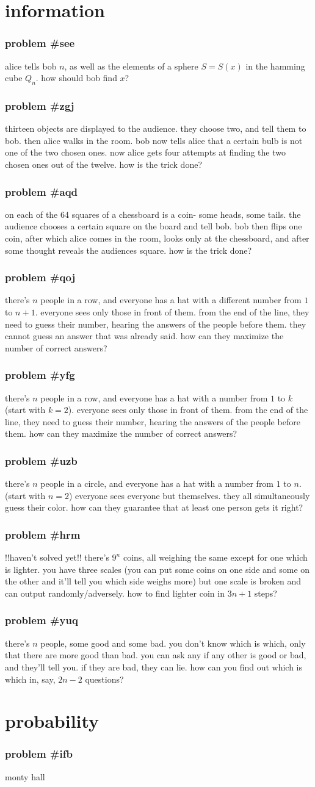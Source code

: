 \documentclass{article}
\newcommand{\problem}[1]{\subsubsection*{\textbf{problem \##1}}}
\newcommand{\chapter}[1]{\section*{#1}}
\begin{document}
\chapter{information}
\problem{see} alice tells bob $n$, as well as the elements of a sphere $S=S(x)$ in the hamming cube $Q_n$. how should bob find $x$?
\problem{zgj} thirteen objects are displayed to the audience. they choose two, and tell them to bob. then alice walks in the room. bob now tells alice that a certain bulb is not one of the two chosen ones. now alice gets four attempts at finding the two chosen ones out of the twelve. how is the trick done?
\problem{aqd} on each of the 64 squares of a chessboard is a coin- some heads, some tails. the audience chooses a certain square on the board and tell bob. bob then flips one coin, after which alice comes in the room, looks only at the chessboard, and after some thought reveals the audiences square. how is the trick done?
\problem{qoj} there's $n$ people in a row, and everyone has a hat with a different number from $1$ to $n+1$. everyone sees only those in front of them. from the end of the line, they need to guess their number, hearing the answers of the people before them. they cannot guess an answer that was already said. how can they maximize the number of correct answers?
\problem{yfg} there's $n$ people in a row, and everyone has a hat with a number from $1$ to $k$ (start with $k=2$). everyone sees only those in front of them. from the end of the line, they need to guess their number, hearing the answers of the people before them. how can they maximize the number of correct answers?
\problem{uzb} there's $n$ people in a circle, and everyone has a hat with a number from $1$ to $n$. (start with $n=2$) everyone sees everyone but themselves. they all simultaneously guess their color. how can they guarantee that at least one person gets it right?
\problem{hrm} !!haven't solved yet!! there's $9^n$ coins, all weighing the same except for one which is lighter. you have three scales (you can put some coins on one side and some on the other and it'll tell you which side weighs more) but one scale is broken and can output randomly/adversely. how to find lighter coin in $3n+1$ steps?
\problem{yuq} there's $n$ people, some good and some bad. you don't know which is which, only that there are more good than bad. you can ask any if any other is good or bad, and they'll tell you. if they are bad, they can lie. how can you find out which is which in, say, $2n-2$ questions?
\chapter{probability}
\problem{ifb} monty hall
\end{document}
